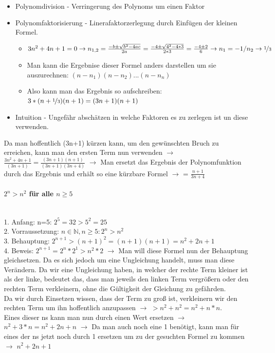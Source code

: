 \documentclass{article}
\newcommand{\paragraphlb}[1]{\paragraph{#1}\mbox{}\\}
\newcommand{\N}{\mathbb{N}}
\begin{document}
	\begin{itemize}
		\item{Polynomdivision - Verringerung des Polynoms um einen Faktor}
		\item{Polynomfaktorisierung - Linerafaktorzerlegung durch Einfügen der kleinen Formel.}
		\begin{itemize}
			\item{$3n^2+4n+1 = 0 \to n_{1,2}=\frac{-b\pm\sqrt{b^2-4ac}}{2a} = \frac{-4\pm\sqrt{4^2-4*3}}{2*3} = \frac{-4\pm2}{6} \to n_1 = -1/n_2 \to \nicefrac{1}{3}$}
			\item{Man kann die Ergebnise dieser Formel anders darstellen um sie auszurechnen: $(n-n_1)(n-n_2)...(n-n_n)$}
			\item{Also kann man das Ergebnis so aufschreiben: $3*(n+\nicefrac{1}{3})(n+1)=(3n+1)(n+1)$}
		\end{itemize}
		\item{Intuition - Ungefähr abschätzen in welche Faktoren es zu zerlegen ist un diese verwenden.}
	\end{itemize}
	Da man hoffentlich (3n+1) kürzen kann, um den gewünschten Bruch zu erreichen, kann man den ersten Term nun verwenden $\to$ $\frac{3n^2+4n+1}{(3n+1)}=\frac{(3n+1)(n+1)}{(3n+1)(3n+4)}$ $\to$ Man ersetzt das Ergebnis der Polynomfunktion durch das Ergebnis und erhält so eine kürzbare Formel $\to$ = $\frac{n+1}{3n+4}$
	\paragraphlb{$2^n > n^2$ für alle $n \geq 5$}
	1. Anfang: n=5: $2^5=32 > 5^2 = 25$ \\
	2. Vorraussetzung: $n\in\N, n\geq 5:2^n>n^2$\\
	3. Behauptung: $2^{n+1} > (n+1)^2=(n+1)(n+1) = n^2+2n+1$ \\
	4. Beweis: $2^{n+1} = 2^n * 2^1 > n^2*2$ $\to$ Man will diese Formel nun der Behauptung gleichsetzen. Da es sich jedoch um eine Ungleichung handelt, muss man diese Verändern. Da wir eine Ungleichung haben, in welcher der rechte Term kleiner ist als der linke, bedeutet das, dass man jeweils den linken Term vergrößern oder den rechten Term verkleinern, ohne die Gültigkeit der Gleichung zu gefährden. \\
	Da wir durch Einsetzen wissen, dass der Term zu groß ist, verkleinern wir den rechten Term um ihn hoffentlich anzupassen $\to$ $> n^2 + n^2 = n^2+n*n$. \\
	Eines dieser ns kann man nun durch einen Wert ersetzen $\to$ $n^2+3*n = n^2+2n+n$ $\to$ Da man auch noch eine 1 benötigt, kann man für eines der ns jetzt noch durch 1 ersetzen um zu der gesuchten Formel zu kommen $\to$ $n^2+2n+1$ \\
\end{document}
